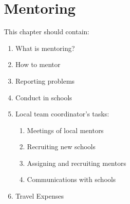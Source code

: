 \chapter{Mentoring}

This chapter should contain:
\begin{enumerate}
\item What is mentoring?
\item How to mentor
\item Reporting problems
\item Conduct in schools
\item Local team coordinator's tasks:
  \begin{enumerate}
  \item Meetings of local mentors
  \item Recruiting new schools
  \item Assigning and recruiting mentors
  \item Communications with schools
  \end{enumerate}
\item Travel Expenses
\end{enumerate}
